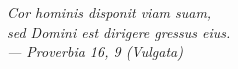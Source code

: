 \textit{%
Cor hominis disponit viam suam,\\
sed Domini est dirigere gressus eius.%
\\
--- Proverbia 16, 9 (Vulgata)%
}

